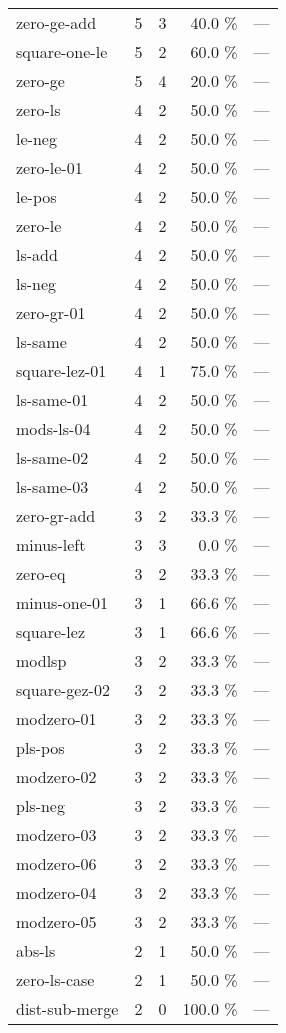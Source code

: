 \documentclass[a4paper]{article}
\begin{document}
\begin{supertabular}{l|r|r|r|r}
zero-ge-add & 5 & 3 & 40.0 \% & ---\\
square-one-le & 5 & 2 & 60.0 \% & ---\\
zero-ge & 5 & 4 & 20.0 \% & ---\\
zero-ls & 4 & 2 & 50.0 \% & ---\\
le-neg & 4 & 2 & 50.0 \% & ---\\
zero-le-01 & 4 & 2 & 50.0 \% & ---\\
le-pos & 4 & 2 & 50.0 \% & ---\\
zero-le & 4 & 2 & 50.0 \% & ---\\
ls-add & 4 & 2 & 50.0 \% & ---\\
ls-neg & 4 & 2 & 50.0 \% & ---\\
zero-gr-01 & 4 & 2 & 50.0 \% & ---\\
ls-same & 4 & 2 & 50.0 \% & ---\\
square-lez-01 & 4 & 1 & 75.0 \% & ---\\
ls-same-01 & 4 & 2 & 50.0 \% & ---\\
mods-ls-04 & 4 & 2 & 50.0 \% & ---\\
ls-same-02 & 4 & 2 & 50.0 \% & ---\\
ls-same-03 & 4 & 2 & 50.0 \% & ---\\
zero-gr-add & 3 & 2 & 33.3 \% & ---\\
minus-left & 3 & 3 & 0.0 \% & ---\\
zero-eq & 3 & 2 & 33.3 \% & ---\\
minus-one-01 & 3 & 1 & 66.6 \% & ---\\
square-lez & 3 & 1 & 66.6 \% & ---\\
modlsp & 3 & 2 & 33.3 \% & ---\\
square-gez-02 & 3 & 2 & 33.3 \% & ---\\
modzero-01 & 3 & 2 & 33.3 \% & ---\\
pls-pos & 3 & 2 & 33.3 \% & ---\\
modzero-02 & 3 & 2 & 33.3 \% & ---\\
pls-neg & 3 & 2 & 33.3 \% & ---\\
modzero-03 & 3 & 2 & 33.3 \% & ---\\
modzero-06 & 3 & 2 & 33.3 \% & ---\\
modzero-04 & 3 & 2 & 33.3 \% & ---\\
modzero-05 & 3 & 2 & 33.3 \% & ---\\
abs-ls & 2 & 1 & 50.0 \% & ---\\
zero-ls-case & 2 & 1 & 50.0 \% & ---\\
dist-sub-merge & 2 & 0 & 100.0 \% & ---\\

\end{supertabular}
\end{document}
